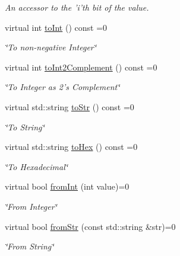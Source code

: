 \begin{DoxyCompactItemize}
\begin{DoxyCompactList}\small\item\em An accessor to the 'i'th bit of the value. \item\end{DoxyCompactList}\item 
virtual int \hyperlink{classiWord_a3349d0a243d3432bb35b76af8420b1d9}{toInt} () const =0
\begin{DoxyCompactList}\small\item\em \char`\"{}To non-\/negative Integer\char`\"{} \item\end{DoxyCompactList}\item 
virtual int \hyperlink{classiWord_a1377d01257b792c748b013be60b089e6}{toInt2Complement} () const =0
\begin{DoxyCompactList}\small\item\em \char`\"{}To Integer as 2's Complement\char`\"{} \item\end{DoxyCompactList}\item 
virtual std::string \hyperlink{classiWord_a0114861c4b660286834ad637f11dc4f4}{toStr} () const =0
\begin{DoxyCompactList}\small\item\em \char`\"{}To String\char`\"{} \item\end{DoxyCompactList}\item 
virtual std::string \hyperlink{classiWord_a7fc28d0251f8acb4dc3f388fc25c57d1}{toHex} () const =0
\begin{DoxyCompactList}\small\item\em \char`\"{}To Hexadecimal\char`\"{} \item\end{DoxyCompactList}\item 
virtual bool \hyperlink{classiWord_ace8c67ceca222808e6435d4aecd39787}{fromInt} (int value)=0
\begin{DoxyCompactList}\small\item\em \char`\"{}From Integer\char`\"{} \item\end{DoxyCompactList}\item 
virtual bool \hyperlink{classiWord_a6abdc96ebfa94d31cd1867fb1d4250fc}{fromStr} (const std::string \&str)=0
\begin{DoxyCompactList}\small\item\em \char`\"{}From String\char`\"{} \item\end{DoxyCompactList}\item 

\end{DoxyCompactItemize}
